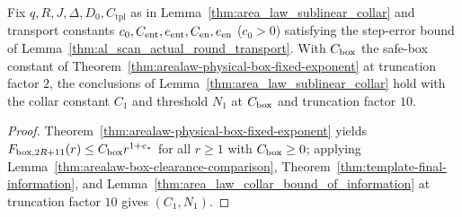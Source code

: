 \begin{lemma}
    \label{thm:area_law_sublinear_collar_explicit}
    \leanok
    Fix $q,R,J,\Delta,D_0,C_{\mathrm{tpl}}$ as in
    Lemma~\ref{thm:area_law_sublinear_collar} and transport constants
    $c_0,C_{\rm ent},e_{\rm ent},C_{\rm en},e_{\rm en}$ ($c_0>0$) satisfying the
    step-error bound of Lemma~\ref{thm:al_scan_actual_round_transport}. With
    $C_{\rm box}$ the safe-box constant of
    Theorem~\ref{thm:arealaw-physical-box-fixed-exponent} at truncation factor
    $2$, the conclusions of Lemma~\ref{thm:area_law_sublinear_collar} hold
    with the collar constant $C_1$ and threshold $N_1$ at $C_{\rm box}$ and
    truncation factor $10$.
\end{lemma}
\begin{proof}\leanok
    Theorem~\ref{thm:arealaw-physical-box-fixed-exponent} yields
    $F_{\mathrm{box},2R+11}(r)\leq C_{\rm box}r^{1+e_*}$ for all $r\geq1$ with
    $C_{\rm box}\geq0$; applying Lemma~\ref{thm:arealaw-box-clearance-comparison},
    Theorem~\ref{thm:template-final-information}, and
    Lemma~\ref{thm:area_law_collar_bound_of_information} at truncation factor
    $10$ gives $(C_1,N_1)$.
\end{proof}
